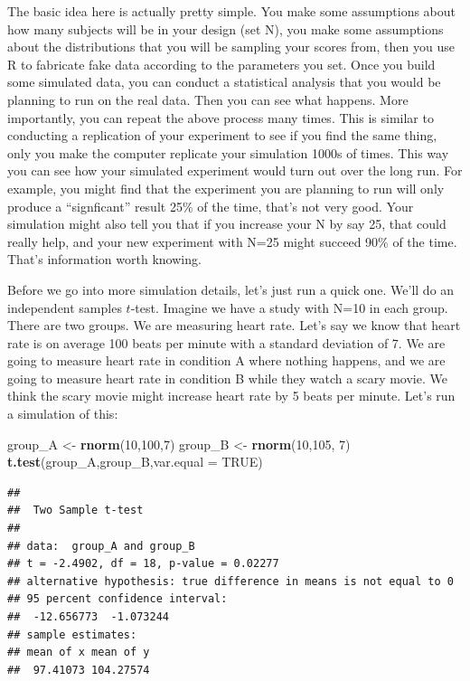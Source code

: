 \documentclass[]{book}
\newenvironment{Shaded}{\begin{snugshade}}{\end{snugshade}}
\newcommand{\DataTypeTok}[1]{\textcolor[rgb]{0.13,0.29,0.53}{#1}}
\newcommand{\DecValTok}[1]{\textcolor[rgb]{0.00,0.00,0.81}{#1}}
\newcommand{\KeywordTok}[1]{\textcolor[rgb]{0.13,0.29,0.53}{\textbf{#1}}}
\newcommand{\NormalTok}[1]{#1}
\newcommand{\OtherTok}[1]{\textcolor[rgb]{0.56,0.35,0.01}{#1}}
\newcommand{\StringTok}[1]{\textcolor[rgb]{0.31,0.60,0.02}{#1}}
\begin{document}
The basic idea here is actually pretty simple. You make some assumptions about how many subjects will be in your design (set N), you make some assumptions about the distributions that you will be sampling your scores from, then you use R to fabricate fake data according to the parameters you set. Once you build some simulated data, you can conduct a statistical analysis that you would be planning to run on the real data. Then you can see what happens. More importantly, you can repeat the above process many times. This is similar to conducting a replication of your experiment to see if you find the same thing, only you make the computer replicate your simulation 1000s of times. This way you can see how your simulated experiment would turn out over the long run. For example, you might find that the experiment you are planning to run will only produce a ``signficant'' result 25\% of the time, that's not very good. Your simulation might also tell you that if you increase your N by say 25, that could really help, and your new experiment with N=25 might succeed 90\% of the time. That's information worth knowing.

Before we go into more simulation details, let's just run a quick one. We'll do an independent samples \(t\)-test. Imagine we have a study with N=10 in each group. There are two groups. We are measuring heart rate. Let's say we know that heart rate is on average 100 beats per minute with a standard deviation of 7. We are going to measure heart rate in condition A where nothing happens, and we are going to measure heart rate in condition B while they watch a scary movie. We think the scary movie might increase heart rate by 5 beats per minute. Let's run a simulation of this:

\begin{Shaded}
\begin{Highlighting}[]
\NormalTok{group_A <-}\StringTok{ }\KeywordTok{rnorm}\NormalTok{(}\DecValTok{10}\NormalTok{,}\DecValTok{100}\NormalTok{,}\DecValTok{7}\NormalTok{)}
\NormalTok{group_B <-}\StringTok{ }\KeywordTok{rnorm}\NormalTok{(}\DecValTok{10}\NormalTok{,}\DecValTok{105}\NormalTok{, }\DecValTok{7}\NormalTok{)}
\KeywordTok{t.test}\NormalTok{(group_A,group_B,}\DataTypeTok{var.equal =} \OtherTok{TRUE}\NormalTok{)}
\end{Highlighting}
\end{Shaded}

\begin{verbatim}
## 
## 	Two Sample t-test
## 
## data:  group_A and group_B
## t = -2.4902, df = 18, p-value = 0.02277
## alternative hypothesis: true difference in means is not equal to 0
## 95 percent confidence interval:
##  -12.656773  -1.073244
## sample estimates:
## mean of x mean of y 
##  97.41073 104.27574
\end{verbatim}
\end{document}
